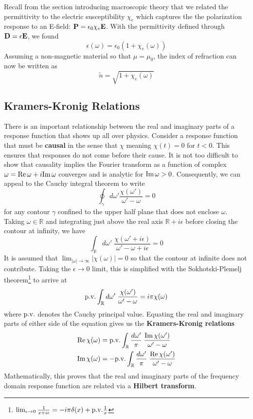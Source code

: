 \documentclass[twocolumn]{gwclass}
\newcommand{\R}{\mathbb{R}}
\newcommand{\bt}[1]{\text{\textbf{#1}}}
\begin{document}
	Recall from the section introducing macroscopic theory that we related the permittivity to the electric susceptibility $\chi_e$ which captures the the polarization response to an E-field: $\bt{P}=\epsilon_0\chi_e\bt{E}$. With the permittivity defined through $\bt{D}=\epsilon\bt{E}$, we found
	$$ \epsilon(\omega) = \epsilon_0(1 + \chi_e(\omega)) $$
	Assuming a non-magnetic material so that $\mu=\mu_0$, the index of refraction can now be written as
	$$ \tilde{n} = \sqrt{1 + \chi_e(\omega)} $$

	\subsection{Kramers-Kronig Relations}
	There is an important relationship between the real and imaginary parts of a response function that shows up all over physics. Consider a response function that must be \textbf{causal} in the sense that $\chi$ meaning $\chi(t) = 0$ for $t<0$. This ensures that responses do not come before their cause. It is not too difficult to show that causality implies the Fourier transform as a function of complex $\omega=\text{\normalfont{Re}}\,\omega+i\text{\normalfont{Im}}\,\omega$ converges and is analytic for $\text{\normalfont{Im}}\,\omega>0$. Consequently, we can appeal to the Cauchy integral theorem to write
	$$\oint_\gamma d\omega' \frac{\chi(\omega')}{\omega'-\omega} = 0 $$
	for any contour $\gamma$ confined to the upper half plane that does not enclose $\omega$. Taking $\omega\in\R$ and integrating just above the real axis $\R + i\epsilon$ before closing the contour at infinity, we have
	$$ \int_{\R} d\omega' \;\frac{\chi(\omega'+i\epsilon)}{\omega'-\omega + i\epsilon}=0 $$
	It is assumed that $\lim_{|\omega|\to\infty}|\chi(\omega)|=0$ so that the contour at infinite does not contribute. Taking the $\epsilon\to 0$ limit, this is simplified with the Sokhotski-Plemelj theorem\footnote{$\lim_{\epsilon\to 0}\frac{1}{x+i\epsilon}= -i\pi\delta(x) + \text{\normalfont{p.v.}}\frac{1}{x}$} to arrive at
	$$ \t{p.v.}\int_\R d\omega'\;\frac{\chi(\omega')}{\omega'-\omega} = i\pi \chi(\omega) $$
	where $\text{\normalfont{p.v.}}$ denotes the Cauchy principal value. Equating the real and imaginary parts of either side of the equation gives us the \textbf{Kramers-Kronig relations}
	\begin{align*}
			\t{Re}\,\chi(\omega) &= \t{p.v.} \int_\R \frac{d\omega'}{\pi}\;\frac{\t{Im}\,\chi(\omega')}{\omega'-\omega} \\
			\t{Im}\,\chi(\omega) &= -\t{p.v.} \int_\R \frac{d\omega'}{\pi}\;\frac{\t{Re}\,\chi(\omega')}{\omega'-\omega}
	\end{align*}
	Mathematically, this proves that the real and imaginary parts of the frequency domain response function are related via a \textbf{Hilbert transform}.
	
\end{document}
